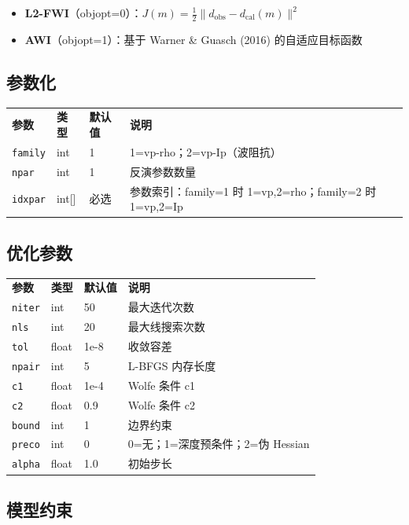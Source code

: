 \documentclass[11pt,a4paper]{ctexart}
\begin{document}
\begin{itemize}
  \item \textbf{L2-FWI}（objopt=0）：$J(m) = \frac12 \| d_{\text{obs}} - d_{\text{cal}}(m) \|^2$
  \item \textbf{AWI}（objopt=1）：基于 Warner \& Guasch (2016) 的自适应目标函数
\end{itemize}

\subsection{参数化}

\begin{tabular}{lllp{5cm}}
\textbf{参数} & \textbf{类型} & \textbf{默认值} & \textbf{说明} \\
\texttt{family} & int & 1 & 1=vp-rho；2=vp-Ip（波阻抗）\\
\texttt{npar}   & int & 1 & 反演参数数量 \\
\texttt{idxpar} & int[] & 必选 & 参数索引：family=1 时 1=vp,2=rho；family=2 时 1=vp,2=Ip \\
\end{tabular}

\subsection{优化参数}

\begin{tabular}{lllp{4cm}}
\textbf{参数} & \textbf{类型} & \textbf{默认值} & \textbf{说明} \\
\texttt{niter} & int & 50 & 最大迭代次数 \\
\texttt{nls}   & int & 20 & 最大线搜索次数 \\
\texttt{tol}   & float & 1e-8 & 收敛容差 \\
\texttt{npair} & int & 5 & L-BFGS 内存长度 \\
\texttt{c1}    & float & 1e-4 & Wolfe 条件 c1 \\
\texttt{c2}    & float & 0.9 & Wolfe 条件 c2 \\
\texttt{bound} & int & 1 & 边界约束 \\
\texttt{preco} & int & 0 & 0=无；1=深度预条件；2=伪 Hessian \\
\texttt{alpha} & float & 1.0 & 初始步长 \\
\end{tabular}

\subsection{模型约束}
\end{document}

